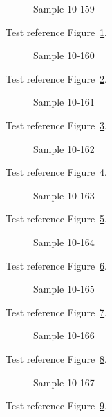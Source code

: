 \begin{figure}[tbhp]
\caption{Sample 10-159}
\label{fig:sample-10-159}
\end{figure}

Test reference Figure~\ref{fig:sample-10-159}.

\begin{figure}[tbhp]
\caption{Sample 10-160}
\label{fig:sample-10-160}
\end{figure}

Test reference Figure~\ref{fig:sample-10-160}.

\begin{figure}[tbhp]
\caption{Sample 10-161}
\label{fig:sample-10-161}
\end{figure}

Test reference Figure~\ref{fig:sample-10-161}.

\begin{figure}[tbhp]
\caption{Sample 10-162}
\label{fig:sample-10-162}
\end{figure}

Test reference Figure~\ref{fig:sample-10-162}.

\begin{figure}[tbhp]
\caption{Sample 10-163}
\label{fig:sample-10-163}
\end{figure}

Test reference Figure~\ref{fig:sample-10-163}.

\begin{figure}[tbhp]
\caption{Sample 10-164}
\label{fig:sample-10-164}
\end{figure}

Test reference Figure~\ref{fig:sample-10-164}.

\begin{figure}[tbhp]
\caption{Sample 10-165}
\label{fig:sample-10-165}
\end{figure}

Test reference Figure~\ref{fig:sample-10-165}.

\begin{figure}[tbhp]
\caption{Sample 10-166}
\label{fig:sample-10-166}
\end{figure}

Test reference Figure~\ref{fig:sample-10-166}.

\begin{figure}[tbhp]
\caption{Sample 10-167}
\label{fig:sample-10-167}
\end{figure}

Test reference Figure~\ref{fig:sample-10-167}.

